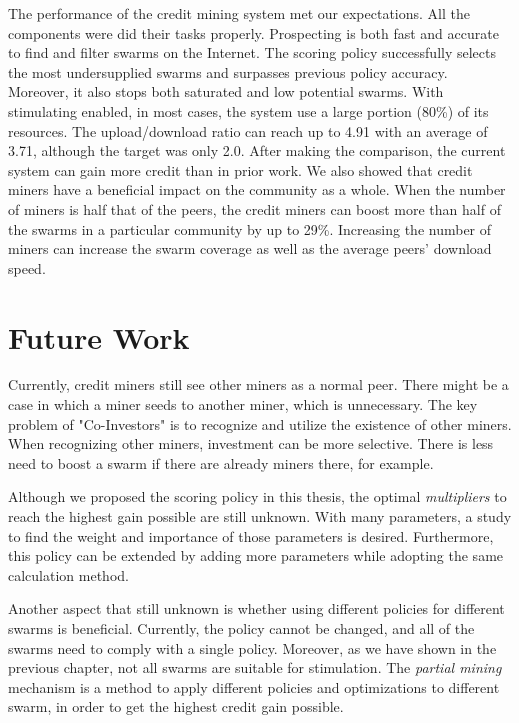 The performance of the credit mining system met our expectations. All the components were did their tasks properly. Prospecting is both fast and accurate to find and filter swarms on the Internet. The scoring policy successfully selects the most undersupplied swarms and surpasses previous policy accuracy. Moreover, it also stops both saturated and low potential swarms. With stimulating enabled, in most cases, the system use a large portion (80\%) of its resources. The upload/download ratio can reach up to 4.91 with an average of 3.71, although the target was only 2.0. After making the comparison, the current system can gain more credit than in prior work. We also showed that credit miners have a beneficial impact on the community as a whole. When the number of miners is half that of the peers, the credit miners can boost more than half of the swarms in a particular community by up to 29\%. Increasing the number of miners can increase the swarm coverage as well as the average peers' download speed.

\section{Future Work}
Currently, credit miners still see other miners as a normal peer. There might be a case in which a miner seeds to another miner, which is unnecessary. The key problem of "Co-Investors" is to recognize and utilize the existence of other miners. When recognizing other miners, investment can be more selective. There is less need to boost a swarm if there are already miners there, for example. 

Although we proposed the scoring policy in this thesis, the optimal \textit{multipliers} to reach the highest gain possible are still unknown. With many parameters, a study to find the weight and importance of those parameters is desired. Furthermore, this policy can be extended by adding more parameters while adopting the same calculation method.

Another aspect that still unknown is whether using different policies for different swarms is beneficial. Currently, the policy cannot be changed, and all of the swarms need to comply with a single policy. Moreover, as we have shown in the previous chapter, not all swarms are suitable for stimulation. The \textit{partial mining} mechanism is a method to apply different policies and optimizations to different swarm, in order to get the highest credit gain possible. 